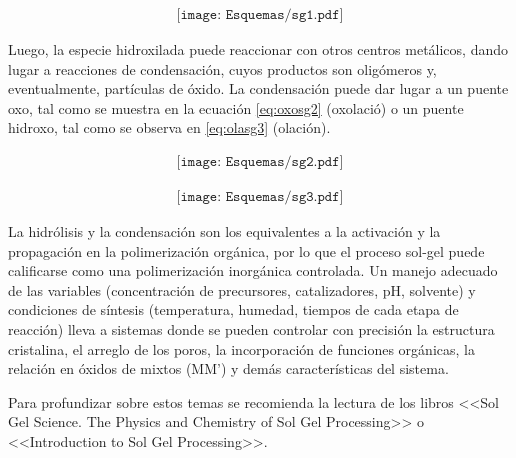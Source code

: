 			 \begin{equation}
 				\begin{aligned}
 				\texttt{[image: Esquemas/sg1.pdf]}
 				\end{aligned}
 				\label{eq:hidrosg1}
 	 			\end{equation}

	Luego, la especie hidroxilada puede reaccionar con otros centros metálicos, dando lugar a reacciones de condensación, cuyos productos son oligómeros y, eventualmente, partículas de óxido. La condensación puede dar lugar a un puente oxo, tal como se muestra en la ecuación \ref{eq:oxosg2} (oxolació) o un puente hidroxo, tal como se observa en \ref{eq:olasg3} (olación). 

			\begin{equation}
		    	\begin{aligned}
 	 	 		\texttt{[image: Esquemas/sg2.pdf]}
 	 	 		\end{aligned}
 	 	 		\label{eq:oxosg2}
 	 	 		\end{equation}

			\begin{equation}
 	 	 		\begin{aligned}
 	 	 		\texttt{[image: Esquemas/sg3.pdf]}
 	 	 		\label{eq:olasg3}
 	 	 		\end{aligned}
 	 	 		\end{equation}

	La hidrólisis y la condensación son los equivalentes a la activación y la propagación en la polimerización orgánica, por lo que el proceso sol-gel puede calificarse como una polimerización inorgánica controlada. Un manejo adecuado de las variables (concentración de precursores, catalizadores, pH, solvente) y condiciones de síntesis (temperatura, humedad, tiempos de cada etapa de reacción) lleva a sistemas donde se pueden controlar con precisión  la estructura cristalina, el arreglo de los poros, la incorporación de funciones orgánicas, la relación en óxidos de mixtos (MM') y demás características del sistema.

	Para profundizar sobre estos temas se recomienda la lectura de los libros <<Sol Gel Science. The Physics and Chemistry of Sol Gel Processing>>\cite{Wright2001} o <<Introduction to Sol Gel Processing>>. \cite{Pierre1998} 

	
